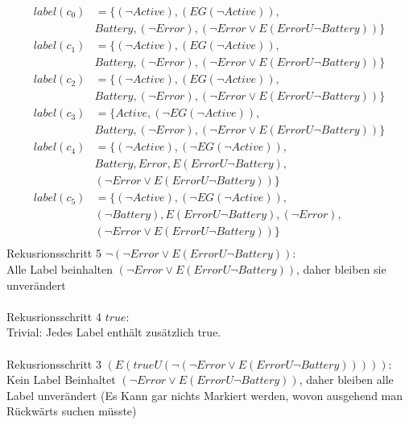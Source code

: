 \begin{align*}
label(c_0)&=\{(\neg Active),(EG(\neg Active)),\\
&Battery,(\neg Error),(\neg Error \vee E(Error U \neg Battery))\}\\
label(c_1)&=\{(\neg Active),(EG(\neg Active)),\\
&Battery,(\neg Error),(\neg Error \vee E(Error U \neg Battery))\}\\
label(c_2)&=\{(\neg Active),(EG(\neg Active)),\\
&Battery,(\neg Error),(\neg Error \vee E(Error U \neg Battery))\}\\
label(c_3)&=\{Active,(\neg EG(\neg Active)),\\
&Battery,(\neg Error),(\neg Error \vee E(Error U \neg Battery))\}\\
label(c_4)&=\{(\neg Active),(\neg EG(\neg Active)),\\
&Battery,Error,E(Error U \neg Battery),\\
&(\neg Error \vee E(Error U \neg Battery))\}\\
label(c_5)&=\{(\neg Active),(\neg EG(\neg Active)),\\
&(\neg Battery),E(Error U \neg Battery),(\neg Error),\\
&(\neg Error \vee E(Error U \neg Battery))\}\\
\end{align*}
Rekusrionsschritt 5 $\neg (\neg Error \vee E(Error U \neg Battery))$:\\
Alle Label beinhalten $(\neg Error \vee E(Error U \neg Battery))$, daher bleiben sie unverändert\\
\\

Rekusrionsschritt 4 $true$:\\
Trivial: Jedes Label enthält zusätzlich true.\\
\\

Rekusrionsschritt 3 $\left(E (trueU (\neg(\neg Error \vee E(Error U \neg Battery))))\right)$:\\
Kein Label Beinhaltet $(\neg Error \vee E(Error U \neg Battery))$, daher bleiben alle Label unverändert (Es Kann gar nichts Markiert werden, wovon ausgehend man Rückwärts suchen müsste) \\
\\

